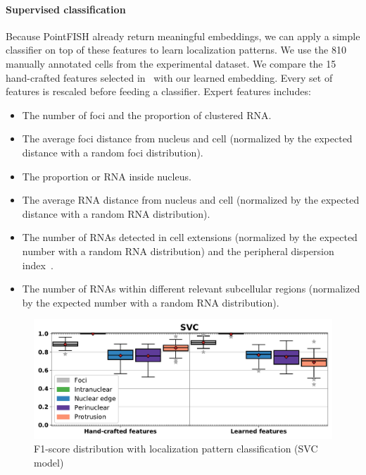\paragraph{Supervised classification}

Because PointFISH already return meaningful embeddings, we can apply a simple classifier on top of these features to learn localization patterns.
We use the 810 manually annotated cells from the experimental dataset.
We compare the 15 hand-crafted features selected in~\cite{CHOUAIB_2020} with our learned embedding.
Every set of features is rescaled before feeding a classifier.
Expert features includes:

\begin{itemize}
	\setlength\itemsep{0.1em}
	\item The number of foci and the proportion of clustered \ac{RNA}.
	\item The average foci distance from nucleus and cell (normalized by the expected distance with a random foci distribution).
	\item The proportion or \ac{RNA} inside nucleus.
	\item The average \ac{RNA} distance from nucleus and cell (normalized by the expected distance with a random \ac{RNA} distribution).
	\item The number of \ac{RNA}s detected in cell extensions (normalized by the expected number with a random \ac{RNA} distribution) and the peripheral dispersion index~\cite{stueland_rdi_2019}.
	\item The number of \ac{RNA}s within different relevant subcellular regions (normalized by the expected number with a random \ac{RNA} distribution).
\end{itemize}

\begin{figure}[h]
    \centering
	\includegraphics[clip, trim=0cm 0cm 0cm 1cm, width=\textwidth]{figures/chapter4/f1_SVC}
    \caption{F1-score distribution with localization pattern classification (SVC model)}
    \label{fig:f1_SVC_real}
\end{figure}

